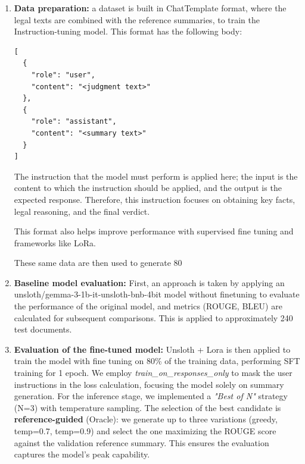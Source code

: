 \documentclass[sigconf]{acmart}
\begin{document}
\begin{enumerate}
    \item \textbf{Data preparation:} a dataset is built in ChatTemplate format, where the legal texts are combined with the reference summaries, to train the Instruction-tuning model. This format has the following body:
    \begin{verbatim}
[
  {
    "role": "user", 
    "content": "<judgment text>"
  },
  {
    "role": "assistant", 
    "content": "<summary text>"
  }
]
\end{verbatim}
    The instruction that the model must perform is applied here; the input is the content to which the instruction should be applied, and the output is the expected response. Therefore, this instruction focuses on obtaining key facts, legal reasoning, and the final verdict.

    This format also helps improve performance with supervised fine tuning and frameworks like LoRa.

These same data are then used to generate 80%
    \item \textbf{Baseline model evaluation:} First, an approach is taken by applying an unsloth/gemma-3-1b-it-unsloth-bnb-4bit model without finetuning to evaluate the performance of the original model, and metrics (ROUGE, BLEU) are calculated for subsequent comparisons. This is applied to approximately 240 test documents.
    \item \textbf{Evaluation of the fine-tuned model:}  Unsloth + Lora is then applied to train the model with fine tuning on 80\% of the training data, performing SFT training for 1 epoch. We employ \emph{train\_on\_responses\_only} to mask the user instructions in the loss calculation, focusing the model solely on summary generation.
    For the inference stage, we implemented a \emph{"Best of N"} strategy (N=3) with temperature sampling. The selection of the best candidate is \textbf{reference-guided} (Oracle): we generate up to three variations (greedy, temp=0.7, temp=0.9) and select the one maximizing the ROUGE score against the validation reference summary. This ensures the evaluation captures the model's peak capability.
\end{enumerate}
\end{document}
